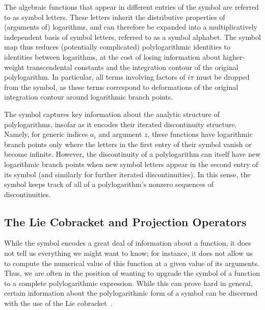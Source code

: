 \documentclass[11pt]{article}
\begin{document}
The algebraic functions that appear in different entries of the symbol are referred to as symbol letters. These letters inherit the distributive properties of (arguments of) logarithms, and can therefore be expanded into a multiplicatively independent basis of symbol letters, referred to as a symbol alphabet. The symbol map thus reduces (potentially complicated) polylogarithmic identities to identities between logarithms, at the cost of losing information about higher-weight transcendental constants and the integration contour of the original polylogarithm. In particular, all terms involving factors of $i\pi$ must be dropped from the symbol, as these terms correspond to deformations of the original integration contour around logarithmic branch points.
 
The symbol captures key information about the analytic structure of polylogarithms, insofar as it encodes their iterated discontinuity structure. Namely, for generic indices $a_i$ and argument $z$, these functions have logarithmic branch points only where the letters in the first entry of their symbol vanish or become infinite. However, the discontinuity of a polylogarithm can itself have new logarithmic branch points when new symbol letters appear in the second entry of its symbol (and similarly for further iterated discontinuities). In this sense, the symbol keeps track of all of a polylogarithm's nonzero sequences of discontinuities. 



\subsection{The Lie Cobracket and Projection Operators}
\label{sec:lie_cobracket}

While the symbol encodes a great deal of information about a function, it does not tell us everything we might want to know; for instance, it does not allow us to compute the numerical value of this function at a given value of its arguments. Thus, we are often in the position of wanting to upgrade the symbol of a function to a complete polylogarithmic expression. While this can prove hard in general, certain information about the polylogarithmic form of a symbol can be discerned with the use of the Lie cobracket~\cite{Golden:2013xva}. 
\end{document}
